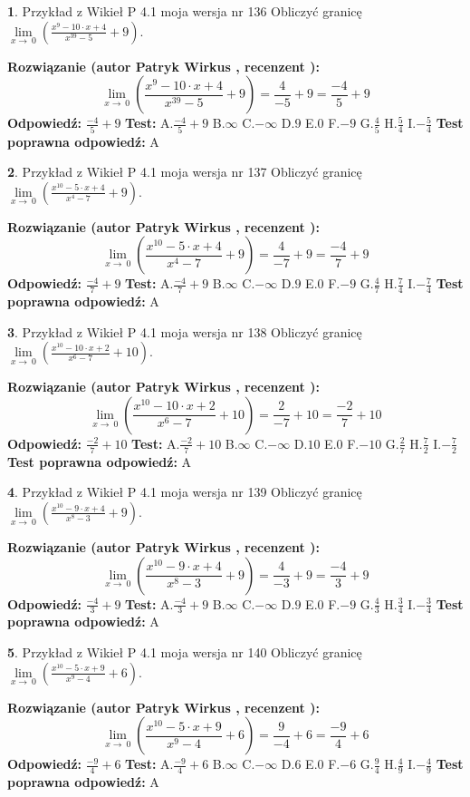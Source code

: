\documentclass[12pt, a4paper]{article}
\theoremstyle{definition} %
\newtheorem{zad}{}
\newcommand{\zadStart}[1]{\begin{zad}#1\newline}
\newcommand{\zadStop}{\end{zad}}
\newcommand{\rozwStart}[2]{\noindent \textbf{Rozwiązanie (autor #1 , recenzent #2): }\newline}
\newcommand{\rozwStop}{\newline}
\newcommand{\odpStart}{\noindent \textbf{Odpowiedź:}\newline}
\newcommand{\odpStop}{\newline}
\newcommand{\testStart}{\noindent \textbf{Test:}\newline}
\newcommand{\testStop}{\newline}
\newcommand{\kluczStart}{\noindent \textbf{Test poprawna odpowiedź:}\newline}
\newcommand{\kluczStop}{\newline}
\begin{document}
\zadStart{Przykład z Wikieł P 4.1 moja wersja nr 136}
Obliczyć granicę $\lim\limits_{x\to\ 0}(\frac{x^{9}-10 \cdot x +4}{x^{39}-5}+9)$.
\zadStop
\rozwStart{Patryk Wirkus}{}
$$\lim\limits_{x\to\ 0}(\frac{x^{9}-10 \cdot x +4}{x^{39}-5}+9)=\frac{4}{-5}+9=\frac{-4}{5}+9$$
\rozwStop
\odpStart
$\frac{-4}{5}+9$
\odpStop
\testStart
A.$\frac{-4}{5}+9$
B.$\infty$
C.$-\infty$
D.$9$
E.$0$
F.$-9$
G.$\frac{4}{5}$
H.$\frac{5}{4}$
I.$-\frac{5}{4}$
\testStop
\kluczStart
A
\kluczStop



\zadStart{Przykład z Wikieł P 4.1 moja wersja nr 137}
Obliczyć granicę $\lim\limits_{x\to\ 0}(\frac{x^{10}-5 \cdot x +4}{x^{4}-7}+9)$.
\zadStop
\rozwStart{Patryk Wirkus}{}
$$\lim\limits_{x\to\ 0}(\frac{x^{10}-5 \cdot x +4}{x^{4}-7}+9)=\frac{4}{-7}+9=\frac{-4}{7}+9$$
\rozwStop
\odpStart
$\frac{-4}{7}+9$
\odpStop
\testStart
A.$\frac{-4}{7}+9$
B.$\infty$
C.$-\infty$
D.$9$
E.$0$
F.$-9$
G.$\frac{4}{7}$
H.$\frac{7}{4}$
I.$-\frac{7}{4}$
\testStop
\kluczStart
A
\kluczStop



\zadStart{Przykład z Wikieł P 4.1 moja wersja nr 138}
Obliczyć granicę $\lim\limits_{x\to\ 0}(\frac{x^{10}-10 \cdot x +2}{x^{6}-7}+10)$.
\zadStop
\rozwStart{Patryk Wirkus}{}
$$\lim\limits_{x\to\ 0}(\frac{x^{10}-10 \cdot x +2}{x^{6}-7}+10)=\frac{2}{-7}+10=\frac{-2}{7}+10$$
\rozwStop
\odpStart
$\frac{-2}{7}+10$
\odpStop
\testStart
A.$\frac{-2}{7}+10$
B.$\infty$
C.$-\infty$
D.$10$
E.$0$
F.$-10$
G.$\frac{2}{7}$
H.$\frac{7}{2}$
I.$-\frac{7}{2}$
\testStop
\kluczStart
A
\kluczStop



\zadStart{Przykład z Wikieł P 4.1 moja wersja nr 139}
Obliczyć granicę $\lim\limits_{x\to\ 0}(\frac{x^{10}-9 \cdot x +4}{x^{8}-3}+9)$.
\zadStop
\rozwStart{Patryk Wirkus}{}
$$\lim\limits_{x\to\ 0}(\frac{x^{10}-9 \cdot x +4}{x^{8}-3}+9)=\frac{4}{-3}+9=\frac{-4}{3}+9$$
\rozwStop
\odpStart
$\frac{-4}{3}+9$
\odpStop
\testStart
A.$\frac{-4}{3}+9$
B.$\infty$
C.$-\infty$
D.$9$
E.$0$
F.$-9$
G.$\frac{4}{3}$
H.$\frac{3}{4}$
I.$-\frac{3}{4}$
\testStop
\kluczStart
A
\kluczStop



\zadStart{Przykład z Wikieł P 4.1 moja wersja nr 140}
Obliczyć granicę $\lim\limits_{x\to\ 0}(\frac{x^{10}-5 \cdot x +9}{x^{9}-4}+6)$.
\zadStop
\rozwStart{Patryk Wirkus}{}
$$\lim\limits_{x\to\ 0}(\frac{x^{10}-5 \cdot x +9}{x^{9}-4}+6)=\frac{9}{-4}+6=\frac{-9}{4}+6$$
\rozwStop
\odpStart
$\frac{-9}{4}+6$
\odpStop
\testStart
A.$\frac{-9}{4}+6$
B.$\infty$
C.$-\infty$
D.$6$
E.$0$
F.$-6$
G.$\frac{9}{4}$
H.$\frac{4}{9}$
I.$-\frac{4}{9}$
\testStop
\kluczStart
A
\kluczStop
\end{document}
